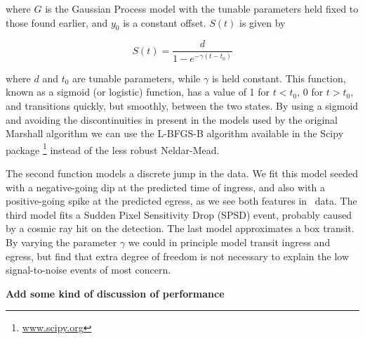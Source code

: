 \noindent
where $G$ is the Gaussian Process model with the tunable parameters held fixed to those found earlier, and $y_0$ is a constant offset. $S(t)$ is given by

\begin{equation}
S(t) = \frac{d}{1 - e^{-\gamma (t-t_0)} }
\end{equation}

\noindent
where $d$ and $t_0$ are tunable parameters, while $\gamma$ is held constant. This function, known as a sigmoid (or logistic) function, has a value of 1 for $t<t_0$, 0 for $t>t_0$, and transitions quickly, but smoothly, between the two states. By using a sigmoid and avoiding the discontinuities in present in the models used by the original Marshall algorithm we can use the L-BFGS-B algorithm \citep{Byrd95} available in the Scipy package \footnote{\url{www.scipy.org}} instead of the less robust Neldar-Mead.

The second function models a discrete jump in the data. We fit this model seeded with a negative-going dip at the predicted time of ingress, and also with a positive-going spike at the predicted egress, as we see both features in \Kepler\ data. The third model fits a Sudden Pixel Sensitivity Drop (SPSD) event, probably caused by a cosmic ray hit on the detection. The last model approximates a box transit. By varying the parameter $\gamma$ we could in principle model transit ingress and egress, but find that extra degree of freedom is not necessary to explain the low signal-to-noise events of most concern.

{\bf Add some kind of discussion of performance}
